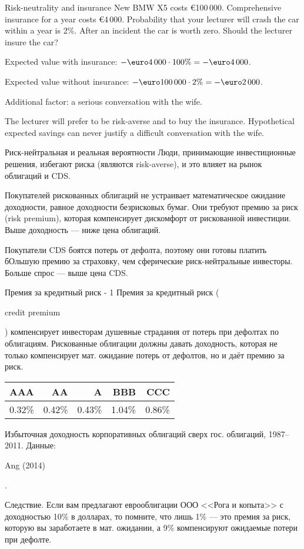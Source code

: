 \documentclass{beamer}
\renewcommand{\EUR}[1]{\textup{\euro}#1}
\newcommand{\en}[1]{\begin{otherlanguage}{english}#1\end{otherlanguage}}
\begin{document}
\begin{frame}{Risk-neutrality and insurance}
\justify
New BMW X5 costs \EUR{100\,000}. Comprehensive insurance for a year costs \EUR{4\,000}. Probability that your lecturer will crash the car within a year is 2\%. After an incident the car is worth zero. Should the lecturer insure the car?

\justify
Expected value with insurance: $-\EUR{4\,000} \cdot 100\% = -\EUR{4\,000}$.

\justify
Expected value without insurance: $-\EUR{100\,000} \cdot 2\% = -\EUR{2\,000}$.

Additional factor: a serious conversation with the wife.

\justify
The lecturer will prefer to be risk-averse and to buy the insurance. Hypothetical expected savings can never justify a difficult conversation with the wife.
\end{frame}



\begin{frame}{Риск-нейтральная и реальная вероятности}
\justify
Люди, принимающие инвестиционные решения, избегают риска (являются risk-averse), и это влияет на рынок облигаций и CDS.

\justify
Покупателей рискованных облигаций не устраивает математическое ожидание доходности, равное доходности безрисковых бумаг. Они требуют премию за риск (risk premium), которая компенсирует дискомфорт от рискованной инвестиции. Выше доходность --- ниже цена облигаций.

\justify
Покупатели CDS боятся потерь от дефолта, поэтому они готовы платить бОльшую премию за страховку, чем сферические риск-нейтральные инвесторы. Больше спрос --- выше цена CDS.
\end{frame}



\begin{frame}{Премия за кредитный риск - 1}
\justify
Премия за кредитный риск (\en{credit premium}) компенсирует инвесторам душевные страдания от потерь при дефолтах по облигациям. Рискованные облигации должны
давать доходность, которая не только компенсирует мат. ожидание потерь от
дефолтов, но и даёт премию за риск.

\justify
\centering
\begin{tabular}{r|r|r|r|r}
AAA    & AA     & A      & BBB    & CCC \\ \hline
0.32\% & 0.42\% & 0.43\% & 1.04\% & 0.86\%  
\end{tabular}

\justify
\centering
{\scriptsize Избыточная доходность корпоративных облигаций сверх гос. 
облигаций, 1987--2011. Данные: \en{Ang (2014)}.}

\justify
Следствие. Если вам предлагают еврооблигации ООО <<Рога и копыта>> с 
доходностью 10\% в долларах, то помните, что лишь 1\% --- это премия за риск,
которую вы заработаете в мат. ожидании, а 9\% компенсируют ожидаемые
потери при дефолте.
\end{frame}
\end{document}
